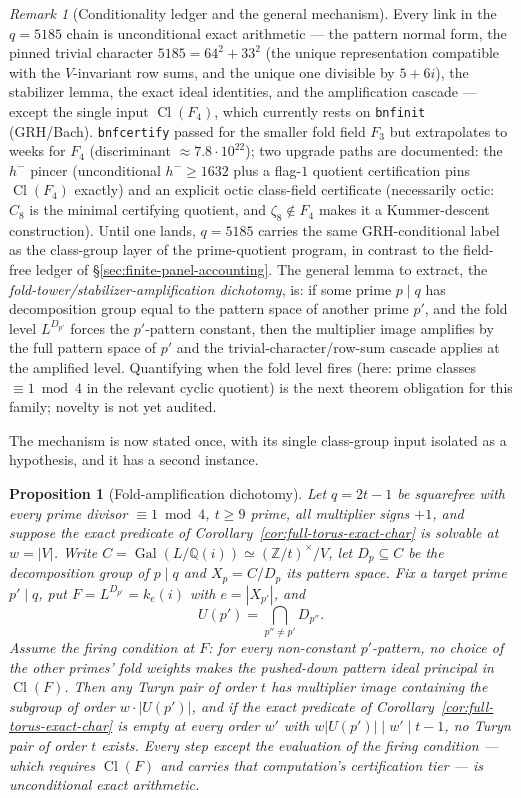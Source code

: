 \documentclass[11pt]{article}
\theoremstyle{plain}
\newtheorem{proposition}[theorem]{Proposition}
\theoremstyle{definition}
\theoremstyle{remark}
\newtheorem{remark}[theorem]{Remark}
\newcommand{\Z}{\mathbb Z}
\newcommand{\Q}{\mathbb Q}
\newcommand{\Cl}{\operatorname{Cl}}
\newcommand{\Gal}{\operatorname{Gal}}
\begin{document}
\begin{remark}[Conditionality ledger and the general mechanism]
\label{rem:small-image-conditional}
Every link in the $q=5185$ chain is unconditional exact arithmetic ---
the pattern normal form, the pinned trivial character
$5185=64^2+33^2$ (the unique representation compatible with the
$V$-invariant row sums, and the unique one divisible by $5+6i$), the
stabilizer lemma, the exact ideal identities, and the amplification
cascade --- except the single input $\Cl(F_4)$, which currently rests
on \texttt{bnfinit} (GRH/Bach).  \texttt{bnfcertify} passed for the
smaller fold field $F_3$ but extrapolates to weeks for $F_4$
(discriminant $\approx7.8\cdot10^{22}$); two upgrade paths are
documented: the $h^-$ pincer (unconditional $h^-\ge1632$ plus a flag-$1$
quotient certification pins $\Cl(F_4)$ exactly) and an explicit octic
class-field certificate (necessarily octic: $C_8$ is the minimal
certifying quotient, and $\zeta_8\notin F_4$ makes it a Kummer-descent
construction).  Until one lands, $q=5185$ carries the same
GRH-conditional label as the class-group layer of the prime-quotient
program, in contrast to the field-free ledger of
\S\ref{sec:finite-panel-accounting}.  The general lemma to extract, the
\emph{fold-tower/stabilizer-amplification dichotomy}, is: if some prime
$p\mid q$ has decomposition group equal to the pattern space of another
prime $p'$, and the fold level $L^{D_{p'}}$ forces the $p'$-pattern
constant, then the multiplier image amplifies by the full pattern space
of $p'$ and the trivial-character/row-sum cascade applies at the
amplified level.  Quantifying when the fold level fires (here: prime
classes $\equiv1\bmod4$ in the relevant cyclic quotient) is the next
theorem obligation for this family; novelty is not yet audited.
\end{remark}

The mechanism is now stated once, with its single class-group input
isolated as a hypothesis, and it has a second instance.

\begin{proposition}[Fold-amplification dichotomy]
\label{prop:fold-dichotomy}
Let $q=2t-1$ be squarefree with every prime divisor $\equiv1\bmod4$,
$t\ge9$ prime, all multiplier signs $+1$, and suppose the exact
predicate of Corollary~\ref{cor:full-torus-exact-char} is solvable at
$w=|V|$.  Write $C=\Gal(L/\Q(i))\simeq(\Z/t)^\times/V$, let
$D_p\subseteq C$ be the decomposition group of $p\mid q$ and
$X_p=C/D_p$ its pattern space.  Fix a target prime $p'\mid q$, put
$F=L^{D_{p'}}=k_e(i)$ with $e=|X_{p'}|$, and
\[
  U(p')=\bigcap_{p''\ne p'}D_{p''}.
\]
Assume the \emph{firing condition} at $F$: for every non-constant
$p'$-pattern, no choice of the other primes' fold weights makes the
pushed-down pattern ideal principal in $\Cl(F)$.  Then any Turyn pair
of order $t$ has multiplier image containing the subgroup of order
$w\cdot|U(p')|$, and if the exact predicate of
Corollary~\ref{cor:full-torus-exact-char} is empty at every order $w'$
with $w|U(p')|\mid w'\mid t-1$, no Turyn pair of order $t$ exists.
Every step except the evaluation of the firing condition --- which
requires $\Cl(F)$ and carries that computation's certification tier
--- is unconditional exact arithmetic.
\end{proposition}
\end{document}
